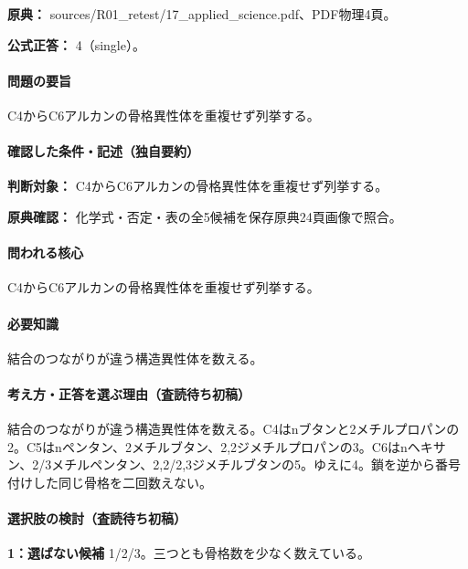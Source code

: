 \noindent\textbf{原典：} sources/R01\_retest/17\_applied\_science.pdf、PDF物理4頁。

\textbf{公式正答：} 4（single）。

\paragraph{問題の要旨} C4からC6アルカンの骨格異性体を重複せず列挙する。

\paragraph{確認した条件・記述（独自要約）}\mbox{}\par

\noindent\textbf{判断対象：} C4からC6アルカンの骨格異性体を重複せず列挙する。\par

\noindent\textbf{原典確認：} 化学式・否定・表の全5候補を保存原典24頁画像で照合。\par

\paragraph{問われる核心} C4からC6アルカンの骨格異性体を重複せず列挙する。

\paragraph{必要知識} 結合のつながりが違う構造異性体を数える。

\paragraph{考え方・正答を選ぶ理由（査読待ち初稿）} 結合のつながりが違う構造異性体を数える。C4はnブタンと2メチルプロパンの2。C5はnペンタン、2メチルブタン、2,2ジメチルプロパンの3。C6はnヘキサン、2/3メチルペンタン、2,2/2,3ジメチルブタンの5。ゆえに4。鎖を逆から番号付けした同じ骨格を二回数えない。

\paragraph{選択肢の検討（査読待ち初稿）}\mbox{}\par

\noindent\textbf{1：選ばない候補} 1/2/3。三つとも骨格数を少なく数えている。\par


